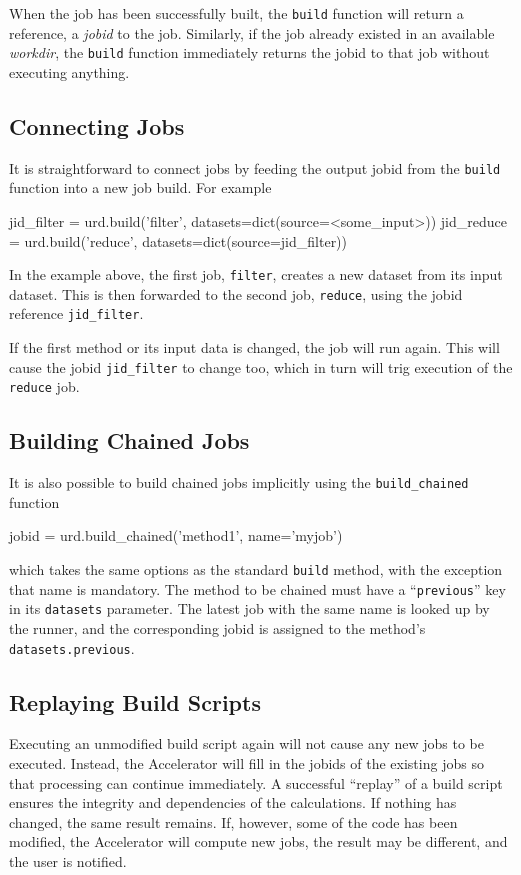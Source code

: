 When the job has been successfully built, the \texttt{build} function
will return a reference, a \textsl{jobid} to the job.  Similarly, if
the job already existed in an available \textsl{workdir}, the
\texttt{build} function immediately returns the jobid to that job
without executing anything.



\subsection{Connecting Jobs}
It is straightforward to connect jobs by feeding the output jobid from
the \texttt{build} function into a new job build.  For example
\begin{python}
jid_filter = urd.build('filter', datasets=dict(source=<some_input>))
jid_reduce = urd.build('reduce', datasets=dict(source=jid_filter))
\end{python}
In the example above, the first job, \texttt{filter}, creates a new
dataset from its input dataset.  This is then forwarded to the second
job, \texttt{reduce}, using the jobid reference \texttt{jid\_filter}.

If the first method or its input data is changed, the job will run
again.  This will cause the jobid \texttt{jid\_filter} to change too,
which in turn will trig execution of the \texttt{reduce} job.



\subsection{Building Chained Jobs}
It is also possible to build chained jobs implicitly using the
\texttt{build\_chained} function
\begin{python}
jobid = urd.build_chained('method1', name='myjob')
\end{python}
which takes the same options as the standard \texttt{build} method,
with the exception that name is mandatory.  The method to be chained
must have a ``\texttt{previous}'' key in its \texttt{datasets}
parameter.  The latest job with the same name is looked up by the
runner, and the corresponding jobid is assigned to the
method's \texttt{datasets.previous}.



\subsection{Replaying Build Scripts}
Executing an unmodified build script again will not cause any new jobs
to be executed.  Instead, the Accelerator will fill in the jobids of
the existing jobs so that processing can continue immediately.  A
successful ``replay'' of a build script ensures the integrity and
dependencies of the calculations.  If nothing has changed, the same
result remains.  If, however, some of the code has been modified, the
Accelerator will compute new jobs, the result may be different, and
the user is notified.




